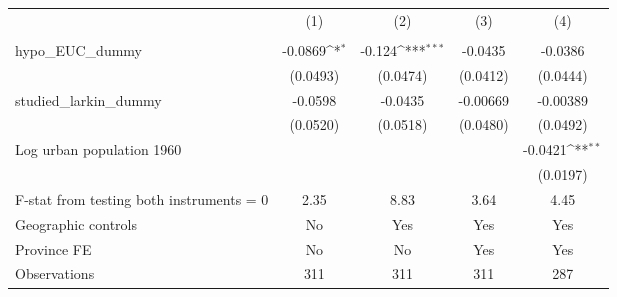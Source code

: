 {
\def\sym#1{\ifmmode^{#1}\else\(^{#1}\)\fi}
\begin{tabular}{l*{4}{c}}
\hline\hline
                &\multicolumn{1}{c}{(1)}&\multicolumn{1}{c}{(2)}&\multicolumn{1}{c}{(3)}&\multicolumn{1}{c}{(4)}\\
                &\multicolumn{1}{c}{}&\multicolumn{1}{c}{}&\multicolumn{1}{c}{}&\multicolumn{1}{c}{}\\
\hline
hypo\_EUC\_dummy  &  -0.0869\sym{*}  &   -0.124\sym{***}&  -0.0435         &  -0.0386         \\
                & (0.0493)         & (0.0474)         & (0.0412)         & (0.0444)         \\
[1em]
studied\_larkin\_dummy&  -0.0598         &  -0.0435         & -0.00669         & -0.00389         \\
                & (0.0520)         & (0.0518)         & (0.0480)         & (0.0492)         \\
[1em]
Log urban population 1960&                  &                  &                  &  -0.0421\sym{**} \\
                &                  &                  &                  & (0.0197)         \\
\hline
F-stat from testing both instruments = 0&     2.35         &     8.83         &     3.64         &     4.45         \\
Geographic controls&       No         &      Yes         &      Yes         &      Yes         \\
Province FE     &       No         &       No         &      Yes         &      Yes         \\
Observations    &      311         &      311         &      311         &      287         \\
\hline\hline
\end{tabular}
}
